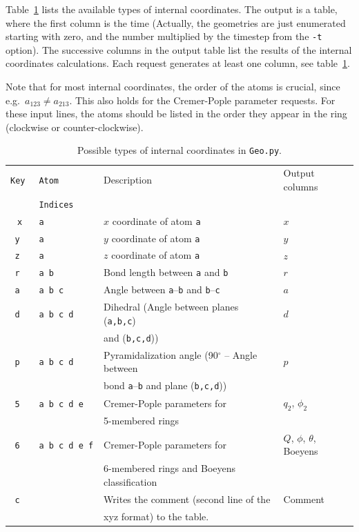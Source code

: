 \documentclass[a4paper,11pt,DIV=15,openany,twoside=false]{scrbook}
\newcommand{\ttt}[1]{\texttt{#1}}
\begin{document}
Table~\ref{tab:Geo_input} lists the available types of internal coordinates. The output is a table, where the first column is the time (Actually, the geometries are just enumerated starting with zero, and the number multiplied by the timestep from the \ttt{-t} option). The successive columns in the output table list the results of the internal coordinates calculations. Each request generates at least one column, see table~\ref{tab:Geo_input}. 

Note that for most internal coordinates, the order of the atoms is crucial, since e.g.\ $a_{123}\neq a_{213}$. This also holds for the Cremer-Pople parameter requests. For these input lines, the atoms should be listed in the order they appear in the ring (clockwise or counter-clockwise).

\begin{table}[h]
  \centering
  \caption{Possible types of internal coordinates in \ttt{Geo.py}. }
  \label{tab:Geo_input}
  \begin{tabular}{>{\tt}c>{\tt}lll}
    \toprule
    \rmfamily Key         &\rmfamily Atom      &Description    &Output columns\\
                          &\rmfamily Indices   &               &\\
    \midrule
    x   &a              &$x$ coordinate of atom \ttt{a}         &$x$\\
    y   &a              &$y$ coordinate of atom \ttt{a}         &$y$\\
    z   &a              &$z$ coordinate of atom \ttt{a}         &$z$\\
    r   &a b            &Bond length between \ttt{a} and \ttt{b}        &$r$\\
    a   &a b c          &Angle between \ttt{a}--\ttt{b} and \ttt{b}--\ttt{c}         &$a$\\
    d   &a b c d        &Dihedral (Angle between planes (\ttt{a,b,c})    &$d$\\
                       &&and (\ttt{b,c,d}))&\\
    p   &a b c d        &Pyramidalization angle (90$^\circ$ -- Angle between    &$p$\\
                       &&bond \ttt{a}--\ttt{b} and plane (\ttt{b,c,d}))&\\
    5   &a b c d e      &Cremer-Pople parameters for &$q_2$, $\phi_2$\\
                       &&5-membered rings&\\
    6   &a b c d e f    &Cremer-Pople parameters for &$Q$, $\phi$, $\theta$, Boeyens\\
                       &&6-membered rings and Boeyens classification&\\
    c   &               &Writes the comment (second line of the &Comment\\
                       &&xyz format) to the table.&\\
    \bottomrule
  \end{tabular}
\end{table}
\end{document}
